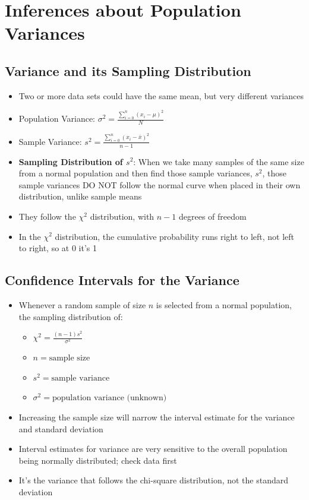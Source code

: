 \documentclass{article}
\begin{document}
\section{Inferences about Population Variances}

\subsection{Variance and its Sampling Distribution}

\begin{itemize}
    \item Two or more data sets could have the same mean, but very different variances
    \item Population Variance: $\sigma^2 = \frac{\sum_{i=0}^{n}{(x_i-\mu)^2}}{N}$
    \item Sample Variance: $s^2 = \frac{\sum_{i=0}^{n}{(x_i-\bar{x})^2}}{n-1}$
    \item \textbf{Sampling Distribution of $s^2$}: When we take many samples of the same size from a normal population and then find those sample variances, $s^2$, those sample variances DO NOT follow the normal curve when placed in their own distribution, unlike sample means
    \item They follow the $\chi^2$ distribution, with $n-1$ degrees of freedom
    \item In the $\chi^2$ distribution, the cumulative probability runs right to left, not left to right, so at 0 it's 1
\end{itemize}

\subsection{Confidence Intervals for the Variance}

\begin{itemize}
    \item Whenever a random sample of size $n$ is selected from a normal population, the sampling distribution of:
    \begin{itemize}
        \item $\chi^2=\frac{(n-1)s^2}{\sigma^2}$
        \item $n=\text{sample size}$
        \item $s^2=\text{sample variance}$
        \item $\sigma^2=\text{population variance (unknown)}$
    \end{itemize}
    \item Increasing the sample size will narrow the interval estimate for the variance and standard deviation
    \item Interval estimates for variance are very sensitive to the overall population being normally distributed; check data first
    \item It's the variance that follows the chi-square distribution, not the standard deviation
\end{itemize}
\end{document}

